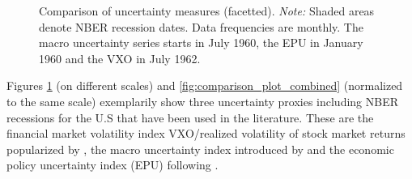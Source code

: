 \documentclass[a4paper,11pt,listof=nochaptergap,oneside,pointednumbers,bibtotoc,bigheadings,liststotoc,hidelinks]{scrbook}
\theoremstyle{mysatz}
\theoremstyle{mydefinition}
\theoremstyle{mytheorem}
\theoremstyle{mybemerkung}
\begin{document}
\begin{figure}[!ht]
   \centering
   \setlength\fboxsep{0pt}
   \setlength\fboxrule{0pt}
      \caption[Comparison of uncertainty measures (facetted).]{Comparison of uncertainty measures (facetted).
      \textit{Note:} Shaded areas denote NBER recession dates. Data frequencies are monthly. The macro uncertainty series starts in July 1960, the EPU in January 1960 and the VXO in July 1962.}   \label{fig:comparison_plot}
\end{figure}

Figures \ref{fig:comparison_plot} (on different scales) and \ref{fig:comparison_plot_combined} (normalized to the same scale) exemplarily show three uncertainty proxies including NBER recessions for the U.S that have been used in the literature. These are the financial market volatility index VXO/realized volatility of stock market returns popularized by \citet{bloom:09}, the macro uncertainty index introduced by \citet{juradoetal:15} and the economic policy uncertainty index (EPU) following \citet{bakeretal:15}.
\end{document}
